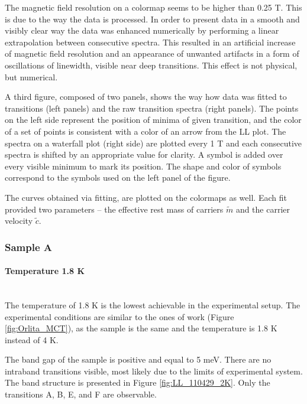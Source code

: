 \documentclass[titlepage,a4paper]{book}
\newcommand{\wciecie}{\quad\phantom{v}}
\newcommand{\myparagraph}[1]{\paragraph{#1}\mbox{}\\}
\begin{document}
The magnetic field resolution on a colormap seems to be higher than 0.25 T. This is due to the way the data is processed. In order to present data in a smooth and visibly clear way the data was enhanced numerically by performing a linear extrapolation between consecutive spectra. This resulted in an artificial increase of magnetic field resolution and an appearance of unwanted artifacts in a form of oscillations of linewidth, visible near deep transitions. This effect is not physical, but numerical.  

A third figure, composed of two panels, shows the way how data was fitted to transitions (left panels) and the raw transition spectra (right panels). The points on the left side represent the position of minima of given transition, and the color of a set of points is consistent with a color of an arrow from the LL plot. The spectra on a waterfall plot (right side) are plotted every 1 T and each consecutive spectra is shifted by an appropriate value for clarity. A symbol is added over every visible minimum to mark its position. The shape and color of symbols correspond to the symbols used on the left panel of the figure. 

The curves obtained via fitting, are plotted on the colormaps as well. Each fit provided two parameters -- the effective rest mass of carriers $\tilde{m}$ and the carrier velocity $\tilde{c}$.

\subsubsection{Sample A}
\myparagraph{Temperature 1.8 K}
\wciecie
The temperature of 1.8 K is the lowest achievable in the experimental setup. The experimental conditions are similar to the ones of work \cite{Orlita_MCT} (Figure \ref{fig:Orlita_MCT}), as the sample is the same and the temperature is 1.8 K instead of 4 K.

The band gap of the sample is positive and equal to 5 meV. There are no intraband transitions visible, most likely due to the limits of experimental system. The band structure is presented in Figure \ref{fig:LL_110429_2K}. Only the transitions A, B, E, and F are observable.
\end{document}

